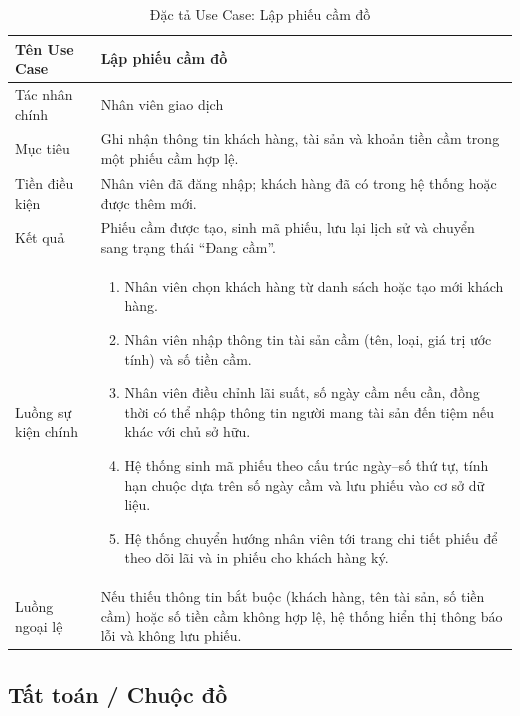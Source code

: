 \documentclass[13pt,a4paper]{extreport}
\begin{document}
\begin{table}[H]
\centering
\caption{Đặc tả Use Case: Lập phiếu cầm đồ}
\label{tab:uc-pawn}
\begin{tabular}{p{4cm}p{10cm}}
\hline
Tên Use Case & Lập phiếu cầm đồ\\
\hline
Tác nhân chính & Nhân viên giao dịch\\
Mục tiêu & Ghi nhận thông tin khách hàng, tài sản và khoản tiền cầm trong một phiếu cầm hợp lệ.\\
Tiền điều kiện & Nhân viên đã đăng nhập; khách hàng đã có trong hệ thống hoặc được thêm mới.\\
Kết quả & Phiếu cầm được tạo, sinh mã phiếu, lưu lại lịch sử và chuyển sang trạng thái ``Đang cầm''.\\
\hline
Luồng sự kiện chính &
\begin{enumerate}
  \item Nhân viên chọn khách hàng từ danh sách hoặc tạo mới khách hàng.
  \item Nhân viên nhập thông tin tài sản cầm (tên, loại, giá trị ước tính) và số tiền cầm.
  \item Nhân viên điều chỉnh lãi suất, số ngày cầm nếu cần, đồng thời có thể nhập thông tin người mang tài sản đến tiệm nếu khác với chủ sở hữu.
  \item Hệ thống sinh mã phiếu theo cấu trúc ngày--số thứ tự, tính hạn chuộc dựa trên số ngày cầm và lưu phiếu vào cơ sở dữ liệu.
  \item Hệ thống chuyển hướng nhân viên tới trang chi tiết phiếu để theo dõi lãi và in phiếu cho khách hàng ký.
\end{enumerate}\\
\hline
Luồng ngoại lệ &
Nếu thiếu thông tin bắt buộc (khách hàng, tên tài sản, số tiền cầm) hoặc số tiền cầm không hợp lệ, hệ thống hiển thị thông báo lỗi và không lưu phiếu.\\
\hline
\end{tabular}
\end{table}

\subsection*{Tất toán / Chuộc đồ}
\end{document}
